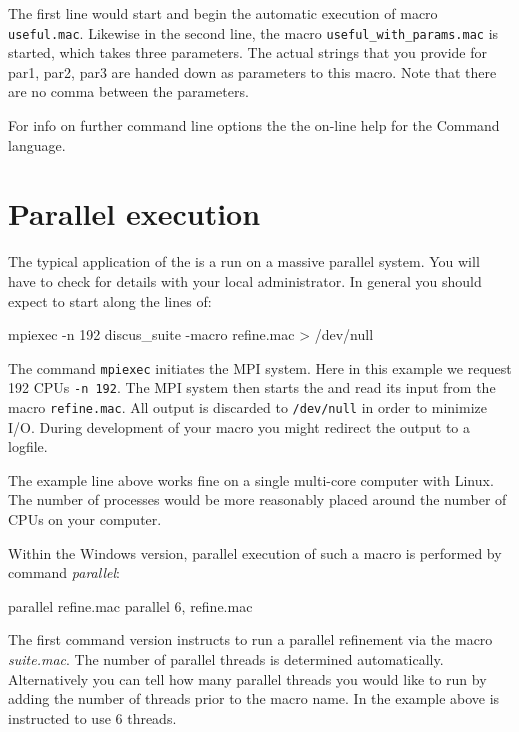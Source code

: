 The first line would start \Suite and begin the automatic execution
of macro {\tt useful.mac}. Likewise in the second line, the macro
{\tt useful\_with\_params.mac} is started, which takes three parameters. 
The actual strings that
you provide for par1, par2, par3 are handed down as parameters to
this macro. Note that there are no comma between the parameters.

For info on further command line options the the on-line help for
the Command language.

\section{Parallel execution \label{intro-par}}

The typical application of the \Suite is a run on a massive parallel 
system. You will have to check for details with your local administrator.
In general you should expect to start \Suite along the lines of:

\begin{MacVerbatim}
mpiexec -n 192 discus_suite -macro refine.mac > /dev/null
\end{MacVerbatim}

The command {\tt mpiexec} initiates the MPI system. Here in this example
we request 192 CPUs {\tt -n 192}. The MPI system then starts the \Suite
and read its input from the macro {\tt refine.mac}. All output is discarded
 to {\tt /dev/null} in order to minimize I/O. During development of your 
macro you might redirect the output to a logfile.

The example line above works fine on a single multi-core computer with 
Linux. The number of processes would be more reasonably placed around 
the number of CPUs on your computer.

Within the Windows version, parallel execution of such a macro is 
performed by \Suite command {\it parallel}:

\begin{MacVerbatim}
parallel refine.mac 
parallel 6, refine.mac 
\end{MacVerbatim}

The first command version instructs \Suite to run a parallel 
refinement via the macro {\it suite.mac}. The number of parallel 
threads is determined automatically. Alternatively you can tell 
\Suite how many parallel threads you would like to run by adding the
number of threads prior to the macro name. In the example above 
\Suite is instructed to use 6 threads.


